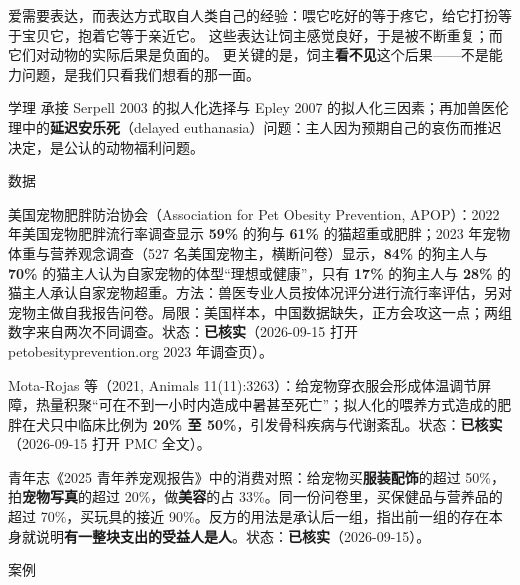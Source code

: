 \documentclass[prep,both]{debate}
\begin{document}
\begin{fields}
\begin{mechanism}[机制 （三步）]
\step 爱需要表达，而表达方式取自人类自己的经验：喂它吃好的等于疼它，给它打扮等于宝贝它，抱着它等于亲近它。
\step 这些表达让饲主感觉良好，于是被不断重复；而它们对动物的实际后果是负面的。
\step 更关键的是，饲主\textbf{看不见}这个后果——不是能力问题，是我们只看我们想看的那一面。

\end{mechanism}
\begin{evidence}{学理}
承接 Serpell 2003 的拟人化选择与 Epley 2007 的拟人化三因素；再加兽医伦理中的\textbf{延迟安乐死}（delayed euthanasia）问题：主人因为预期自己的哀伤而推迟决定，是公认的动物福利问题。
\end{evidence}
\begin{evidence}{数据}

\end{evidence}
\begin{bullets}
\item 美国宠物肥胖防治协会（Association for Pet Obesity Prevention, APOP）：2022 年美国宠物肥胖流行率调查显示 \textbf{59\%} 的狗与 \textbf{61\%} 的猫超重或肥胖；2023 年宠物体重与营养观念调查（527 名美国宠物主，横断问卷）显示，\textbf{84\%} 的狗主人与 \textbf{70\%} 的猫主人认为自家宠物的体型“理想或健康”，只有 \textbf{17\%} 的狗主人与 \textbf{28\%} 的猫主人承认自家宠物超重。方法：兽医专业人员按体况评分进行流行率评估，另对宠物主做自我报告问卷。局限：美国样本，中国数据缺失，正方会攻这一点；两组数字来自两次不同调查。状态：\textbf{已核实}（2026-09-15 打开 petobesityprevention.org 2023 年调查页）。
\item Mota-Rojas 等（2021, Animals 11(11):3263）：给宠物穿衣服会形成体温调节屏障，热量积聚“可在不到一小时内造成中暑甚至死亡”；拟人化的喂养方式造成的肥胖在犬只中临床比例为 \textbf{20\% 至 50\%}，引发骨科疾病与代谢紊乱。状态：\textbf{已核实}（2026-09-15 打开 PMC 全文）。
\item 青年志《2025 青年养宠观报告》中的消费对照：给宠物买\textbf{服装配饰}的超过 50\%，拍\textbf{宠物写真}的超过 20\%，做\textbf{美容}的占 33\%。同一份问卷里，买保健品与营养品的超过 70\%，买玩具的接近 90\%。反方的用法是承认后一组，指出前一组的存在本身就说明\textbf{有一整块支出的受益人是人}。状态：\textbf{已核实}（2026-09-15）。
\end{bullets}
\begin{evidence}{案例}


\end{evidence}
\end{fields}
\end{document}
